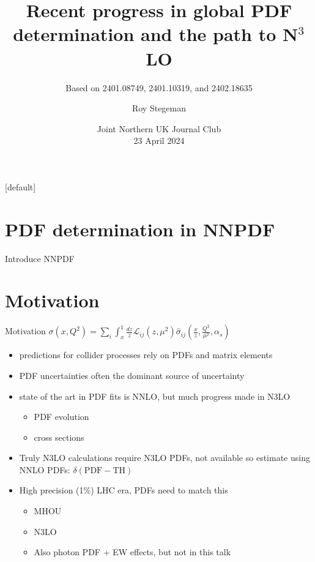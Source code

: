 \documentclass[aspectratio=169, 9pt,t]{beamer}
\title{Recent progress in global PDF determination and the path to N$^3$LO}
\subtitle{Based on 2401.08749, 2401.10319, and 2402.18635 }
\date{Joint Northern UK Journal Club  \\[0.1cm] 23 April 2024}
\author{Roy Stegeman}
\institute{\small The University of Edinburgh}
\begin{document}
{
\begin{frame}
  \titlepage
\end{frame}
}

[default]



\newcommand{\nn}{\vspace*{1em}}

\section*{PDF determination in NNPDF}

\begin{frame}{Introduce NNPDF}
\end{frame}



\section*{Motivation}

\begin{frame}{Motivation}
  $\sigma(x,Q^2)=\sum_i \int_x^1 \frac{dz}{z} \mathcal{L}_{ij}(z,\mu^2)\hat{\sigma}_{ij}\left(\frac{x}{z},\frac{Q^2}{\mu^2},\alpha_s\right)$

  \begin{itemize}
    \item predictions for collider processes rely on PDFs and matrix elements
    \item PDF uncertainties often the dominant source of uncertainty
    \item state of the art in PDF fits is NNLO, but much progress made in N3LO
    \begin{itemize}
      \item PDF evolution
      \item cross sections
    \end{itemize}
    \item Truly N3LO calculations require N3LO PDFs, not available so estimate using NNLO PDFs: $\delta(\mathrm{PDF-TH})$
    \item High precision (1\%) LHC era, PDFs need to match this
    \begin{itemize}
      \item MHOU
      \item N3LO
      \item Also photon PDF + EW effects, but not in this talk
    \end{itemize}
  \end{itemize}
\end{frame}
\end{document}
